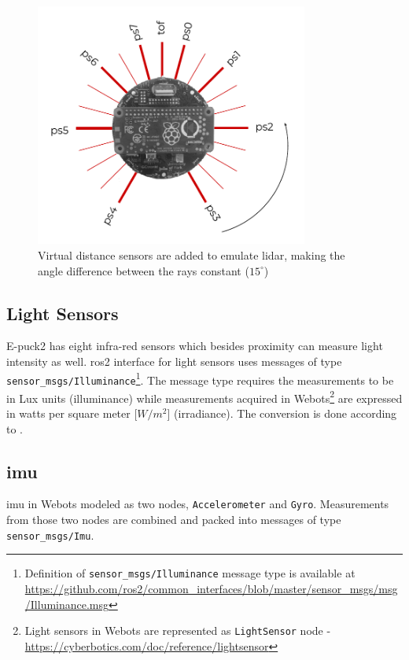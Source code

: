\begin{figure}[H]
    \centering
    \includegraphics[width=0.8\textwidth]{simulation/figures/laserscan.pdf}
    \caption{Virtual distance sensors are added to emulate \ac{lidar}, making the angle difference between the rays constant ($15^\circ$)}
    \label{fig:simulation:laserscan}
\end{figure}

\subsection{Light Sensors}
E-puck2 has eight infra-red sensors which besides proximity can measure light intensity as well. \ac{ros2} interface for light sensors uses messages of type \texttt{sensor\_msgs/Illuminance}\footnote{Definition of \texttt{sensor\_msgs/Illuminance} message type is available at \url{https://github.com/ros2/common_interfaces/blob/master/sensor_msgs/msg/Illuminance.msg}}. The message type requires the measurements to be in Lux units (illuminance) while measurements acquired in Webots\footnote{Light sensors in Webots are represented as \texttt{LightSensor} node - \url{https://cyberbotics.com/doc/reference/lightsensor}} are expressed in watts per square meter [$W/m^2$] (irradiance). The conversion is done according to \cite{michael_conversion_2019}.

\subsection{\acl{imu}}
\ac{imu} in Webots modeled as two nodes, \texttt{Accelerometer} and \texttt{Gyro}. Measurements from those two nodes are combined and packed into messages of type \texttt{sensor\_msgs/Imu}.

